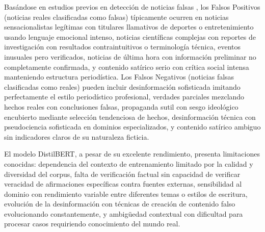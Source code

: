 Basándose en estudios previos en detección de noticias falsas \cite{posadas2019detection, blanco2024enhancing}, los Falsos Positivos (noticias reales clasificadas como falsas) típicamente ocurren en noticias sensacionalistas legítimas con titulares llamativos de deportes o entretenimiento usando lenguaje emocional intenso, noticias científicas complejas con reportes de investigación con resultados contraintuitivos o terminología técnica, eventos inusuales pero verificados, noticias de última hora con información preliminar no completamente confirmada, y contenido satírico serio con crítica social intensa manteniendo estructura periodística. Los Falsos Negativos (noticias falsas clasificadas como reales) pueden incluir desinformación sofisticada imitando perfectamente el estilo periodístico profesional, verdades parciales mezclando hechos reales con conclusiones falsas, propaganda sutil con sesgo ideológico encubierto mediante selección tendenciosa de hechos, desinformación técnica con pseudociencia sofisticada en dominios especializados, y contenido satírico ambiguo sin indicadores claros de su naturaleza ficticia.

El modelo DistilBERT, a pesar de su excelente rendimiento, presenta limitaciones conocidas: dependencia del contexto de entrenamiento limitado por la calidad y diversidad del corpus, falta de verificación factual sin capacidad de verificar veracidad de afirmaciones específicas contra fuentes externas, sensibilidad al dominio con rendimiento variable entre diferentes temas o estilos de escritura, evolución de la desinformación con técnicas de creación de contenido falso evolucionando constantemente, y ambigüedad contextual con dificultad para procesar casos requiriendo conocimiento del mundo real.

\begin{table}[htbp]
\centering
{}
\caption{Estrategias propuestas para abordar limitaciones identificadas.}
\label{tab:estrategias_mejora}
\end{table}

